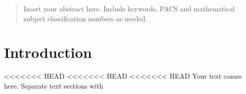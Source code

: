 \date{Received: date / Accepted: date}


\maketitle

\begin{abstract}
Insert your abstract here. Include keywords, PACS and mathematical
subject classification numbers as needed.
\end{abstract}

\section{Introduction}
\label{sec:1}
<<<<<<< HEAD
<<<<<<< HEAD
<<<<<<< HEAD
Your text comes here. Separate text sections with

